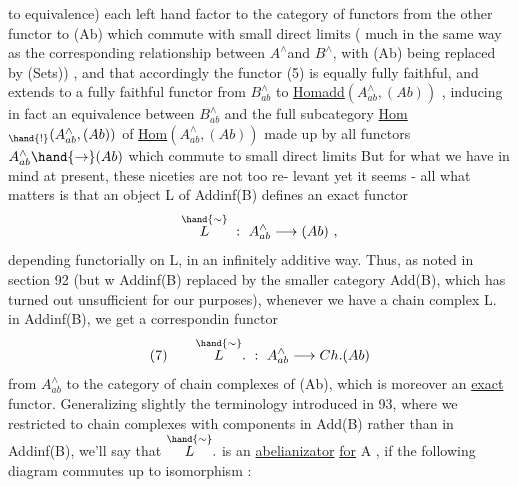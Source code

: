 
to equivalence)  each left hand factor to the category of functors
from the other functor to (Ab)  which commute with small direct limits
\xout{(}( much in the same way as the corresponding relationship between $A^{\wedge}$and
$B^{\wedge}$, with (Ab)  being replaced by (Sets))\xout{)} ,  and that accordingly the
functor (5) is equally fully faithful,  and extends to a fully faithful
functor from $B^{\wedge}_{ab}$ to  \uline{Homadd}$(A^{\wedge}_{ab},(Ab))$ ,  inducing in fact an equivalence
between $B^{\wedge}_{ab}$  and the full subcategory  \uline{Hom}$_{\hand{!}}(A^{\wedge}_{ab},(Ab))$ of \uline{Hom}$(A^{\wedge}_{ab},(Ab))$
made up by all functors  $A^{\wedge}_{ab}\hand{\to}(Ab)$  which commute to small direct limits
But for what we have in mind at present,  these niceties are not too re-%
levant yet it seems  -  all what matters is that an object L of Addinf(B)
defines an exact functor
\[ \overset{\hand{\sim}}{L} \ : \ A^{\wedge}_{ab} \longrightarrow (Ab) \ , \]
depending functorially on L,  in an infinitely additive way.  Thus,  as
noted in section 92  (but w Addinf(B)  replaced by the smaller
category Add(B),  which has turned out unsufficient for our purposes),
whenever we have a chain complex L.  in Addinf(B),  we get a correspondin
functor
\[ \text{(7)} \qquad \overset{\hand{\sim}}{L}. \ : \ A^{\wedge}_{ab} \longrightarrow Ch.(Ab) \]
from $A^{\wedge}_{ab}$ to the category of chain complexes of (Ab),  which is moreover
an \uline{exact} functor.  Generalizing slightly the  terminology introduced
in 93,   where we restricted to chain complexes with components in
Add(B) rather than in Addinf(B),  we'll say that  $\overset{\hand{\sim}}{L}.$  is an \uline{abelianizator}
\uline{for}  A  ,  if the  following diagram commutes up to isomorphism :
